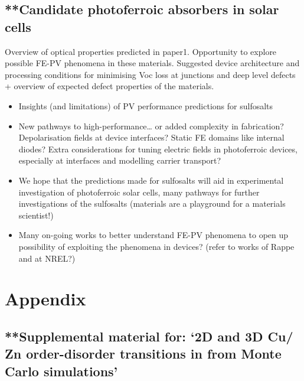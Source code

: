 \documentclass[11pt, twoside]{report}
\begin{document}
\section{**Candidate photoferroic absorbers in solar cells}
Overview of optical properties predicted in paper1. Opportunity to explore possible FE-PV phenomena in these materials. Suggested device architecture and processing conditions for minimising Voc loss at junctions and deep level defects + overview of expected defect properties of the materials.
\begin{itemize}
\item Insights (and limitations) of PV performance predictions for sulfosalts
\item New pathways to high-performance… or added complexity in fabrication? Depolarisation fields at device interfaces? Static FE domains like internal diodes? Extra considerations for tuning electric fields in photoferroic devices, especially at interfaces and modelling carrier transport?
\item We hope that the predictions made for sulfosalts will aid in experimental investigation of photoferroic solar cells, many pathways for further investigations of the sulfosalts (materials are a playground for a materials scientist!)
\item Many on-going works to better understand FE-PV phenomena to open up possibility of exploiting the phenomena in devices? (refer to works of Rappe and at NREL?)
\end{itemize}






\appendix
\chapter{Appendix}

\section{**Supplemental material for: `2D and 3D Cu/ Zn order-disorder transitions in {\CZTS} from Monte Carlo simulations'}

\end{document}
